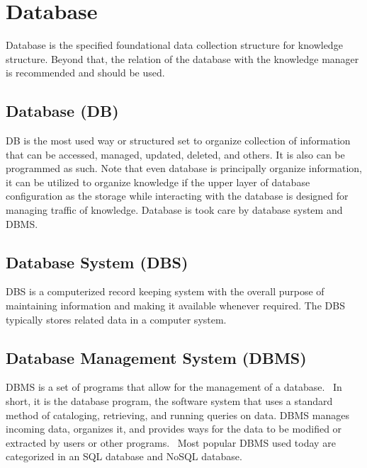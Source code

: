 \section{Database}
\label{sec:database}

Database is the specified foundational data collection structure for knowledge structure.
Beyond that, the relation of the database with the knowledge manager is recommended and should be used.

\subsection{Database (DB)}
\label{ssec:database}

\ac{DB} is the most used way or structured set to organize collection of information that can be accessed, managed, updated, deleted, and others.
It is also can be programmed as such.
Note that even database is principally organize information, it can be utilized to organize knowledge if the upper layer of database configuration as the storage while interacting with the database is designed for managing traffic of knowledge.
Database is took care by database system and \ac{DBMS}.

\subsection{Database System (DBS)}
\label{ssec:database-system}

\ac{DBS} is a computerized record keeping system with the overall purpose of maintaining information and making it available whenever required.
The \ac{DBS} typically stores related data in a computer system.~\autocite{Foster2014Intro}

\subsection{Database Management System (DBMS)}
\label{ssec:dbms}

\ac{DBMS} is a set of programs that allow for the
management of a database.~\autocite{Foster2014Intro}
In short, it is the database program, the software system that uses a standard method of cataloging, retrieving, and running queries on data. \ac{DBMS} manages incoming data, organizes it, and provides ways for the data to be modified or extracted by users or other programs.~\autocite{TechTerms:2014:DBMS}
Most popular \ac{DBMS} used today are categorized in an \ac{SQL} database and \ac{NoSQL} database.

